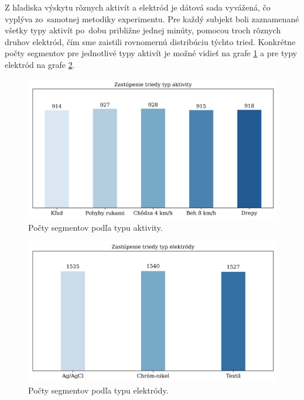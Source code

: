 Z hľadiska výskytu rôznych aktivít a elektród je dátová sada vyvážená, čo vyplýva zo~samotnej metodiky experimentu. Pre každý subjekt boli zaznamenané všetky typy aktivít po~dobu približne jednej minúty, pomocou troch rôznych druhov elektród, čím sme zaistili rovnomernú distribúciu týchto tried. Konkrétne počty segmentov pre jednotlivé typy aktivít je možné vidieť na grafe \ref{fig:activity_stats} a pre typy elektród na grafe \ref{fig:electrode_stats}.

\begin{figure}[H]
    \centering    
    \includegraphics[scale=0.07]{img/activity_stats.jpg}
    \caption{Počty segmentov podľa typu aktivity.}
    \label{fig:activity_stats}
\end{figure}

\begin{figure}[H]
    \centering    
    \includegraphics[scale=0.07]{img/electrode_stats.jpg}
    \caption{Počty segmentov podľa typu elektródy.}
    \label{fig:electrode_stats}
\end{figure}


